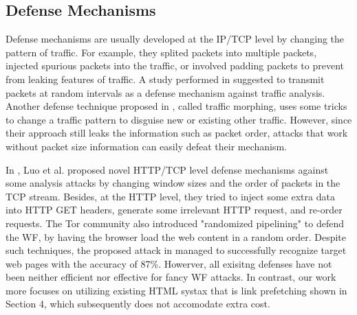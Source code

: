 

\subsection{Defense Mechanisms}

Defense mechanisms are usually developed at the IP/TCP level by changing the pattern of traffic.
For example, they splited packets into multiple packets, injected spurious packets into the traffic, or involved  padding packets to prevent from leaking features of traffic.
A study performed in \cite{fu2003} suggested to transmit packets at random intervals as a defense mechanism against traffic analysis.
Another defense technique proposed in \cite{wright2009}, called traffic morphing, uses some tricks to change a traffic pattern to disguise new or existing other traffic.
However, since their approach still leaks the information such as packet order, attacks that work without packet size information can easily defeat their mechanism.

In \cite{luo2011}, Luo et al. proposed novel HTTP/TCP level defense mechanisms against some analysis attacks by changing window sizes and the order of packets in the TCP stream.
Besides, at the HTTP level, they tried to inject some extra data into HTTP GET headers, generate some irrelevant HTTP request, and re-order requests.
The Tor community also introduced "randomized pipelining" \cite{perry11} to defend the WF, by having the browser load the web content in a random order.
Despite such techniques, the proposed attack in \cite{cai2012touching} managed to successfully recognize target web pages with the accuracy of 87\%. 
Howerver, all exisitng defenses have not been neither efficient nor effective for fancy WF attacks. %
In contrast, our work more focuses on utilizing existing HTML systax that is link prefetching shown in Section 4, which subsequently does not accomodate extra cost.

